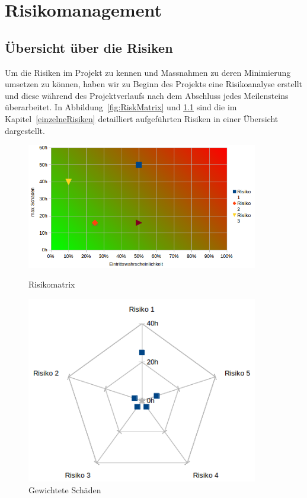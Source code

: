 \chapter{Risikomanagement}
	\label{risiken}
	
	\section{Übersicht über die Risiken}
		Um die Risiken im Projekt zu kennen und Massnahmen zu deren Minimierung umsetzen zu können, haben wir zu Beginn des Projekts eine Risikoanalyse erstellt und diese während des Projektverlaufs nach dem Abschluss jedes Meilensteins überarbeitet.
		In Abbildung~\ref{fig:RiskMatrix} und \ref{fig:RiskMatrixWeightedDamage} sind die im Kapitel~\ref{einzelneRisiken} detailliert aufgeführten Risiken in einer Übersicht dargestellt.
		
		\begin{figure}[H]
			\begin{minipage}[b]{\largeThird\linewidth}
				\includegraphics[width=0.9\textwidth]{projectPlan/media/img/risikomatrix.png}
				\centering
				\caption{Risikomatrix}
				\label{fig:RiskMatrix}
			\end{minipage}
			\begin{minipage}[b]{\smallThird\linewidth}
				\includegraphics[width=0.9\textwidth]{projectPlan/media/img/risikomatrixGewichteterSchaden.png}
				\centering
				\caption{Gewichtete Schäden}
				\label{fig:RiskMatrixWeightedDamage}
			\end{minipage}
		\end{figure}
	

